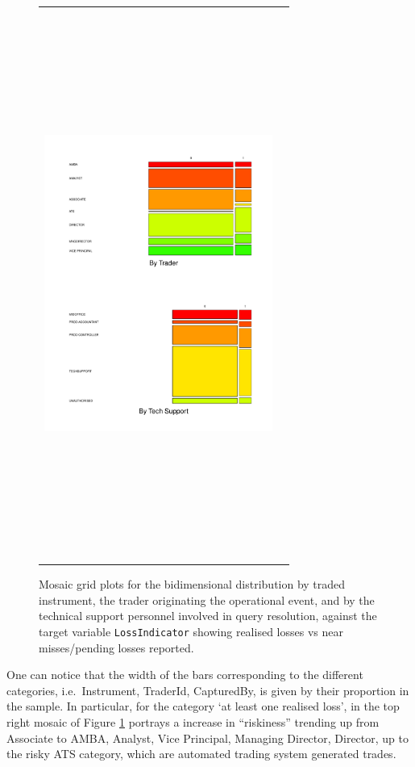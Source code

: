 \documentclass{DissertateUSU}
\begin{document}
\begin{figure}
\begin{frame}
\begin{tabular}{cc}
         \includegraphics[width=7.5cm,height=18cm]{Stacked_TrId_TechSup.pdf}
         \end{tabular}
    \end{frame}
    \caption{Mosaic grid plots for the bidimensional distribution by traded instrument, the trader originating the operational event, and by the technical support personnel involved in query resolution, against the target variable \texttt{LossIndicator} showing realised losses vs near misses/pending losses reported.}
    \label{Mosaic_Instr_Trd_Tec}
\end{figure}

One can notice that the width of the bars corresponding to the different
categories, i.e.~Instrument, TraderId, CapturedBy, is given by their
proportion in the sample. In particular, for the category `at least one
realised loss', in the top right mosaic of Figure
\ref{Mosaic_Instr_Trd_Tec} portrays a increase in ``riskiness'' trending
up from Associate to AMBA, Analyst, Vice Principal, Managing Director,
Director, up to the risky ATS category, which are automated trading
system generated trades.\medskip
\end{document}
